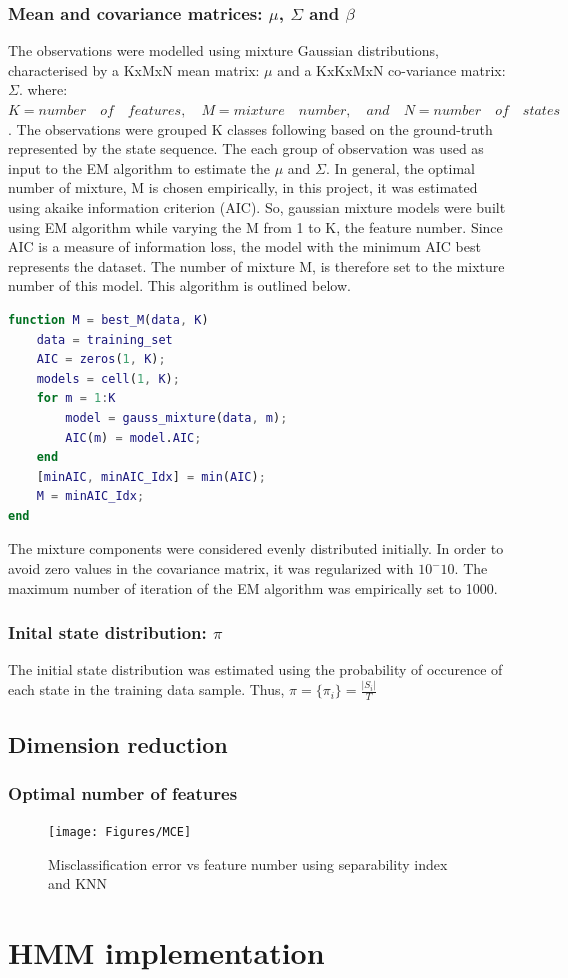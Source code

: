 \subsubsection{Mean and covariance matrices: \(\mu\), \(\Sigma\) and \(\beta\)}

The observations were modelled using mixture Gaussian distributions, characterised by a KxMxN mean matrix: \(\mu\) and a KxKxMxN co-variance matrix: \(\Sigma\).
where: \\ \(K = number \quad of \quad features, \quad M = mixture \quad number, \quad and \quad N = number \quad of \quad states\).
The observations were grouped K classes following based on the ground-truth represented by the state sequence.
The each group of observation was used as input to the EM algorithm to estimate the  \(\mu\) and \(\Sigma\).
In general, the optimal number of mixture, M is chosen empirically, in this project, it was estimated using akaike information criterion (AIC).
So, gaussian mixture models were built using EM algorithm while varying the M from 1 to K, the feature number.
Since AIC is a measure of information loss, the model with the minimum AIC best represents the dataset. The number of mixture M, is therefore set to the mixture number of this model.
This algorithm is outlined below.
\begin{lstlisting}[language=Matlab] 
function M = best_M(data, K)
	data = training_set
	AIC = zeros(1, K);
	models = cell(1, K);
	for m = 1:K
		model = gauss_mixture(data, m);
		AIC(m) = model.AIC;
	end
	[minAIC, minAIC_Idx] = min(AIC);
	M = minAIC_Idx;
end
\end{lstlisting} 

The mixture components were considered evenly distributed initially.
In order to avoid zero values in the covariance matrix, it was regularized with \(10^-10\).
The maximum number of iteration of the EM algorithm was empirically set to 1000.

\subsubsection{Inital state distribution: \(\pi\)}
The initial state distribution was estimated using the probability of occurence of each state in the training data sample.
Thus, \(\pi = \{\pi_i\} = \frac{|S_i|}{T} \)
\subsection{Dimension reduction}
\subsubsection{Optimal number of features}

\begin{figure}[ht!]
	\texttt{[image: Figures/MCE]}
	\caption{Misclassification error vs feature number using separability index and KNN}
	\label{fig:opt-dim}
\end{figure}

\section{HMM implementation}